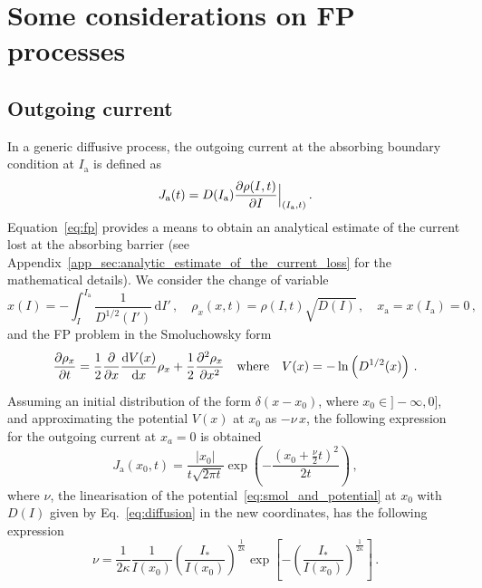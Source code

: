 \section{Some considerations on FP processes}\label{sec:some_considerations}

\subsection{Outgoing current}\label{subsec:outgoing_current}


In a generic diffusive process, the outgoing current at the absorbing boundary condition at $I_\mathrm{a}$ is defined as
\begin{equation}
    J_\mathrm{a}(t) = D(I_\mathrm{a})\pdv{\rho(I, t)}{I} \Bigr|_{(I_\mathrm{a}, t)}\,.
    \label{eq:outgoing_current_definition}
\end{equation}
Equation~\eqref{eq:fp} provides a means to obtain an analytical estimate of the current lost at the absorbing barrier (see Appendix~\ref{app_sec:analytic_estimate_of_the_current_loss} for the mathematical details). We consider the change of variable
\begin{equation}
    x(I) = -\int_I^{I_\mathrm{a}} \frac{1}{D^{1/2}(I')}\,\mathrm{d}I' \,, \quad \rho_x(x,t) = \rho(I, t) \sqrt{D(I)} \,, \quad x_\mathrm{a}=x(I_\mathrm{a})=0 \, ,
    \label{eq:change_of_variable}
\end{equation}
and the FP problem in the Smoluchowsky form
\begin{equation}
    \pdv{\rho_x}{t} = \frac{1}{2}\pdv{x} \dv{V(x)}{x} \rho_x+\frac{1}{2}\pdv[2]{\rho_x}{x} \quad \text{where} \quad V(x) = -\ln\left(D^{1/2}(x)\right) \, .
    \label{eq:smol_and_potential}
\end{equation}

{Assuming an initial distribution of the form $\delta(x - x_0)$, where $x_0 \in ] -\infty, 0]$, and approximating the potential $V(x)$ at $x_0$ as $-\nu \, x$, the following expression for the outgoing current at  $x_a = 0$ is obtained}
\begin{equation}
    J_\mathrm{a}(x_0, t) = \frac{|x_0|}{t\sqrt{2\pi t}}\exp\left(-\frac{(x_0+\frac{\nu}{2}t)^2}{2t}\right) \,,
    \label{eq:thecurrent}
\end{equation}
where $\nu$, the linearisation of the potential~\eqref{eq:smol_and_potential} at $x_0$ with $D(I)$ given by Eq.~\eqref{eq:diffusion} in the new coordinates, has the following expression
\begin{equation}
    \nu=\frac{1}{2\kappa}\frac{1}{I(x_0)}\left(\frac{I_\ast}{I(x_0)}\right)^{\frac{1}{2\kappa}}\exp\left[-\left(\frac{I_\ast}{I(x_0)}\right)^{\frac{1}{2\kappa}}\right]\,.
    \label{eq:linearised}
\end{equation}

